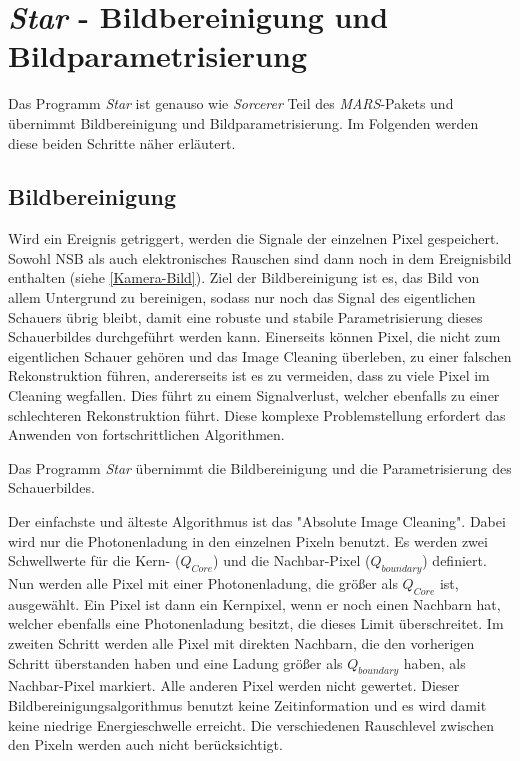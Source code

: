 \section{\textit{Star} - Bildbereinigung und Bildparametrisierung}
\label{sec:Star-ImageCleaning}
Das Programm \textit{Star} ist genauso wie \textit{Sorcerer} Teil des \textit{MARS}-Pakets und übernimmt Bildbereinigung und Bildparametrisierung.
Im Folgenden werden diese beiden Schritte näher erläutert.


\subsection{Bildbereinigung}

Wird ein Ereignis getriggert, werden die Signale der einzelnen Pixel gespeichert.
Sowohl NSB als auch elektronisches Rauschen sind dann noch in dem Ereignisbild enthalten (siehe \autoref{Kamera-Bild}).
Ziel der Bildbereinigung ist es, das Bild von allem Untergrund zu bereinigen, sodass nur noch das Signal des eigentlichen Schauers übrig bleibt, damit eine robuste und stabile Parametrisierung dieses Schauerbildes durchgeführt werden kann.
Einerseits können Pixel, die nicht zum eigentlichen Schauer gehören und das Image Cleaning überleben, zu einer falschen Rekonstruktion führen, andererseits ist es zu vermeiden, dass zu viele Pixel im Cleaning wegfallen. 
Dies führt zu einem Signalverlust, welcher ebenfalls zu einer schlechteren Rekonstruktion führt.
Diese komplexe Problemstellung erfordert das Anwenden von fortschrittlichen Algorithmen.

Das Programm \textit{Star} übernimmt die Bildbereinigung und die Parametrisierung des Schauerbildes.

Der einfachste und älteste Algorithmus ist das "Absolute Image Cleaning".
Dabei wird nur die Photonenladung in den einzelnen Pixeln benutzt.
Es werden zwei Schwellwerte für die Kern- ($Q_{Core}$) und die Nachbar-Pixel ($Q_{boundary}$) definiert.
Nun werden alle Pixel mit einer Photonenladung, die größer als $Q_{Core}$ ist, ausgewählt.
Ein Pixel ist dann ein Kernpixel, wenn er noch einen Nachbarn hat, welcher ebenfalls eine Photonenladung besitzt, die dieses Limit überschreitet.
Im zweiten Schritt werden alle Pixel mit direkten Nachbarn, die den vorherigen Schritt überstanden haben und eine Ladung größer als $Q_{boundary}$ haben, als Nachbar-Pixel markiert.
Alle anderen Pixel werden nicht gewertet.
Dieser Bildbereinigungsalgorithmus benutzt keine Zeitinformation und es wird damit keine niedrige Energieschwelle erreicht. 
Die verschiedenen Rauschlevel zwischen den Pixeln werden auch nicht berücksichtigt.


